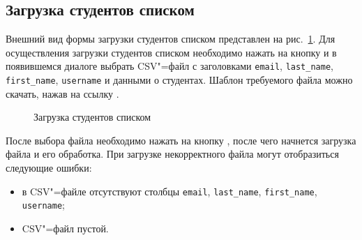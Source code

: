 

\subsection{Загрузка студентов списком}

Внешний вид формы загрузки студентов списком представлен на рис.~\ref{img:student:mass_invite}. 
Для осуществления загрузки студентов списком необходимо нажать на кнопку  и в появившемся диалоге 
выбрать CSV"=файл с заголовками {\tt email}, {\tt last\_name}, {\tt first\_name}, {\tt username} и данными о студентах. 
Шаблон требуемого файла можно скачать, нажав на ссылку .

\begin{figure}[H]
	\caption{Загрузка студентов списком}
	\label{img:student:mass_invite}
\end{figure}

После выбора файла необходимо нажать на кнопку , после чего начнется загрузка файла и его обработка.
При загрузке некорректного файла могут отобразиться следующие ошибки:
\begin{itemize}
	\item в CSV"=файле отсутствуют столбцы {\tt email}, {\tt last\_name}, {\tt first\_name}, {\tt username};
	\item CSV"=файл пустой.
\end{itemize} 

